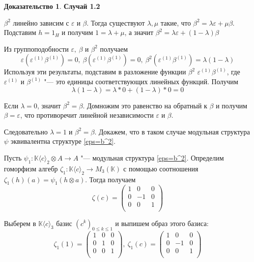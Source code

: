 \documentclass[a4paper, 12pt]{article}
\theoremstyle{definition}
\newtheorem*{prof}{\hspace*{\parindent}Доказательство}
\begin{document}
\begin{prof}
    \textbf{Случай 1.2}
    
    $\beta^2$ линейно зависим с $\varepsilon$ и $\beta$. Тогда существуют $\lambda, \mu$ такие, что $\beta^2 = \lambda \varepsilon+\mu \beta$. Подставим $h = 1_H$ и получим $1 = \lambda+\mu$, а значит $\beta^2 = \lambda \varepsilon + (1 - \lambda)\beta$
    
    Из группоподобности $\varepsilon,\ \beta$ и $\beta^2$ получаем 
    \[
    \varepsilon(\varepsilon^{(1)}\beta^{(1)}) = 0,\ \beta(\varepsilon^{(1)}\beta^{(1)}) = 0,\ \beta^2(\varepsilon^{(1)}\beta^{(1)}) = \lambda(1-\lambda)
    \]
    Используя эти результаты, подставим в разложение функции $\beta^2$  $\varepsilon^{(1)}\beta^{(1)}$, где $\varepsilon^{(1)}$ и $\beta^{(1)}$ "--- это единицы соответствующих линейных функций. Получим 
    \[\lambda(1-\lambda) = \lambda*0 + (1-\lambda)*0 = 0\]

    Если $\lambda = 0$, значит $\beta^2 = \beta$. Домножим это равенство на обратный к $\beta$ и получим $\beta = \varepsilon$, что противоречит линейной независимости $\varepsilon$ и $\beta$.

    Следовательно $\lambda = 1$ и $\beta^2 = \beta$. Докажем, что в таком случае модульная структура $\psi$ эквивалентна структуре \ref{eps=b^2}.

    Пусть $\psi_1: \mathbb{K}\langle c\rangle_2 \otimes A \to A$ "--- модульная структура \ref{eps=b^2}.
    Определим гоморфизм алгебр $\zeta_1:\mathbb{K}\langle c\rangle_2 \to M_3(\mathbb{K})$ с помощью соотношения ${\zeta_1(h)(a)=\psi_1(h \otimes a)}$. Тогда получаем \[
    \zeta(c) = \begin{pmatrix}
        1 & 0 & 0\\
        0 & -1 & 0\\
        0 & 0 & 1\\
    \end{pmatrix}
    \]

    Выберем в $\mathbb{K}\langle c\rangle_3$  базис $(c^k)_{0 \leq k \leq 1}$ и выпишем образ этого базиса:
    \[
    \zeta_1(1) = \begin{pmatrix}
        1 & 0 & 0\\
        0 & 1 & 0\\
        0 & 0 & 1\\
    \end{pmatrix},\
    \zeta_1(c) = \begin{pmatrix}
        1 & 0 & 0\\
        0 & -1 & 0\\
        0 & 0 & 1\\
    \end{pmatrix}
    \]


\end{prof}
\end{document}
